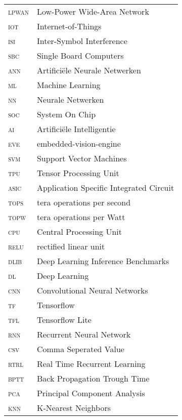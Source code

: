 \begin{longtable}{ll}
\textsc{lpwan}	& Low-Power Wide-Area Network\\
\textsc{iot}	& Internet-of-Things\\
\textsc{isi}	& Inter-Symbol Interference\\
\textsc{sbc}	& Single Board Computers\\
\textsc{ann}	& Artifici\"ele Neurale Netwerken\\
\textsc{ml}	& Machine Learning\\
\textsc{nn}	& Neurale Netwerken\\
\textsc{soc}	& System On Chip\\
\textsc{ai}	& Artifici\"ele Intelligentie\\
\textsc{eve}	& embedded-vision-engine\\
\textsc{svm}	& Support Vector Machines\\
\textsc{tpu}	& Tensor Processing Unit\\
\textsc{asic}	& Application Specific Integrated Circuit\\
\textsc{tops}	& tera operations per second\\
\textsc{topw}	& tera operations per Watt\\
\textsc{cpu}	& Central Processing Unit\\
\textsc{relu}	& rectified linear unit\\
\textsc{dlib}	& Deep Learning Inference Benchmarks\\
\textsc{dl}	& Deep Learning\\
\textsc{cnn}	& Convolutional Neural Networks\\
\textsc{tf}	& Tensorflow\\
\textsc{tfl}	& Tensorflow Lite\\
\textsc{rnn}	& Recurrent Neural Network\\
\textsc{csv}	& Comma Seperated Value\\
\textsc{rtrl}	& Real Time Recurrent Learning\\
\textsc{bptt}	& Back Propagation Trough Time\\
\textsc{pca}	& Principal Component Analysis\\
\textsc{knn}	& K-Nearest Neighbors\\


\end{longtable}


